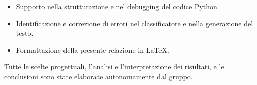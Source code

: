 \documentclass[12pt, a4paper]{article}
\begin{document}
\begin{itemize}[leftmargin=1.5cm]
    \item Supporto nella strutturazione e nel debugging del codice Python.
    \item Identificazione e correzione di errori nel classificatore
          e nella generazione del testo.
    \item Formattazione della presente relazione in \LaTeX.
\end{itemize}

Tutte le scelte progettuali, l'analisi e l'interpretazione dei
risultati, e le conclusioni sono state elaborate autonomamente
dal gruppo.

\end{document}
